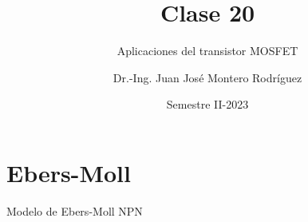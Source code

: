\documentclass[t,aspectratio=169]{beamer}
\title{Clase 20}
\subtitle{Aplicaciones del transistor MOSFET}
\author{Dr.-Ing. Juan José Montero Rodríguez}
\institute{Escuela de Ingeniería Electrónica}
\date{Semestre II-2023}
\begin{document}
\begin{frame}{}
\maketitle
\end{frame}

\section{Ebers-Moll}
\begin{frame}{Modelo de Ebers-Moll NPN}


\end{frame}
\end{document}
